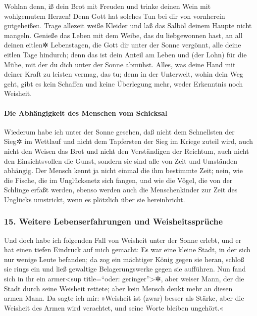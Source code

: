 Wohlan denn, iß dein Brot mit Freuden und trinke deinen
Wein mit wohlgemutem Herzen! Denn Gott hat solches Tun bei dir von
vornherein gutgeheißen. Trage allezeit weiße Kleider und
laß das Salböl deinem Haupte nicht mangeln. Genieße das
Leben mit dem Weibe, das du liebgewonnen hast, an all deinen eitlen✲
Lebenstagen, die Gott dir unter der Sonne vergönnt, alle deine eitlen
Tage hindurch; denn das ist dein Anteil am Leben und (der Lohn) für die
Mühe, mit der du dich unter der Sonne abmühst. Alles, was
deine Hand mit deiner Kraft zu leisten vermag, das tu; denn in der
Unterwelt, wohin dein Weg geht, gibt es kein Schaffen und keine
Überlegung mehr, weder Erkenntnis noch Weisheit.

\hypertarget{die-abhuxe4ngigkeit-des-menschen-vom-schicksal}{%
\paragraph{Die Abhängigkeit des Menschen vom
Schicksal}\label{die-abhuxe4ngigkeit-des-menschen-vom-schicksal}}

Wiederum habe ich unter der Sonne gesehen, daß nicht dem
Schnellsten der Sieg✲ im Wettlauf und nicht dem Tapfersten der Sieg im
Kriege zuteil wird, auch nicht den Weisen das Brot und nicht den
Verständigen der Reichtum, auch nicht den Einsichtsvollen die Gunst,
sondern sie sind alle von Zeit und Umständen abhängig.
Der Mensch kennt ja nicht einmal die ihm bestimmte Zeit;
nein, wie die Fische, die im Unglücksnetz sich fangen, und wie die
Vögel, die von der Schlinge erfaßt werden, ebenso werden auch die
Menschenkinder zur Zeit des Unglücks umstrickt, wenn es plötzlich über
sie hereinbricht.

\hypertarget{weitere-lebenserfahrungen-und-weisheitsspruxfcche}{%
\subsubsection{15. Weitere Lebenserfahrungen und
Weisheitssprüche}\label{weitere-lebenserfahrungen-und-weisheitsspruxfcche}}

Und doch habe ich folgenden Fall von Weisheit unter der
Sonne erlebt, und er hat einen tiefen Eindruck auf mich gemacht:
Es war eine kleine Stadt, in der sich nur wenige Leute
befanden; da zog ein mächtiger König gegen sie heran, schloß sie rings
ein und ließ gewaltige Belagerungswerke gegen sie aufführen.
Nun fand sich in ihr ein armer\textless sup title=``oder:
geringer''\textgreater✲, aber weiser Mann, der die Stadt durch seine
Weisheit rettete; aber kein Mensch denkt mehr an diesen armen Mann.
Da sagte ich mir: »Weisheit ist (zwar) besser als Stärke,
aber die Weisheit des Armen wird verachtet, und seine Worte bleiben
ungehört.«

